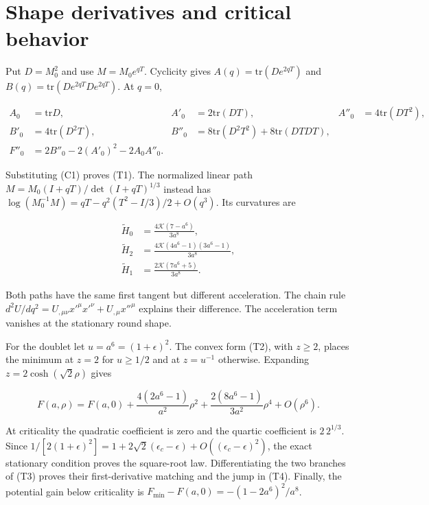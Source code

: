 \section{Shape derivatives and critical behavior}

\label{app:D}

Put $D=M_0^2$ and use $M=M_0e^{qT}$. Cyclicity gives $A(q)=\mathrm{tr}(De^{2qT})$ and $B(q)=\mathrm{tr}(De^{2qT}De^{2qT})$. At $q=0$,

\begin{equation}\tag{D1}\label{eq:D1}
\begin{aligned}
A_0&=\mathrm{tr}D,& A'_0&=2\mathrm{tr}(DT),&
A''_0&=4\mathrm{tr}(DT^2),\\
B'_0&=4\mathrm{tr}(D^2T),&
B''_0&=8\mathrm{tr}(D^2T^2)+8\mathrm{tr}(DTDT),\\
F''_0&=2B''_0-2(A'_0)^2-2A_0A''_0.
\end{aligned}
\end{equation}

Substituting (C1) proves (T1). The normalized linear path $M=M_0(I+qT)/\det(I+qT)^{1/3}$ instead has $\log(M_0^{-1}M)=qT-q^2(T^2-I/3)/2+O(q^3)$. Its curvatures are

\begin{equation}\tag{D2}\label{eq:D2}
\begin{aligned}
\widetilde H_0&=\frac{4\mathcal K(7-a^6)}{3a^8},\\
\widetilde H_2&=\frac{4\mathcal K(4a^6-1)(3a^6-1)}{3a^8},\\
\widetilde H_1&=\frac{2\mathcal K(7a^6+5)}{3a^8}.
\end{aligned}
\end{equation}

Both paths have the same first tangent but different acceleration. The chain rule $d^2U/dq^2=U_{,\mu\nu}x'^\mu x'^\nu+U_{,\mu}x''^\mu$ explains their difference. The acceleration term vanishes at the stationary round shape.

For the doublet let $u=a^6=(1+\epsilon)^2$. The convex form (T2), with $z\ge2$, places the minimum at $z=2$ for $u\ge1/2$ and at $z=u^{-1}$ otherwise. Expanding $z=2\cosh(\sqrt2\rho)$ gives

\begin{equation}\tag{D3}\label{eq:D3}
F(a,\rho)=F(a,0)
+\frac{4(2a^6-1)}{a^2}\rho^2
+\frac{2(8a^6-1)}{3a^2}\rho^4+O(\rho^6).
\end{equation}

At criticality the quadratic coefficient is zero and the quartic coefficient is $2\,2^{1/3}$. Since $1/[2(1+\epsilon)^2]=1+2\sqrt2(\epsilon_c-\epsilon)+O((\epsilon_c-\epsilon)^2)$, the exact stationary condition proves the square-root law. Differentiating the two branches of (T3) proves their first-derivative matching and the jump in (T4). Finally, the potential gain below criticality is $F_{\min}-F(a,0)=-(1-2a^6)^2/a^8$.
